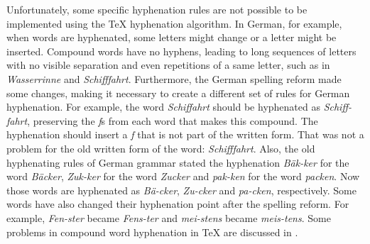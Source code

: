 \documentclass{article}
\begin{document}
Unfortunately, some specific hyphenation rules are not possible to be
implemented using the \TeX{} hyphenation algorithm. In German, for example,
when words are hyphenated, some letters might change or a letter might be
inserted.  Compound words have no hyphens, leading to long sequences of letters
with no visible separation and even repetitions of a same letter, such as in
\emph{Wasserrinne} and \emph{Schifffahrt}. Furthermore, the German spelling
reform made some changes, making it necessary to create a different set of
rules for German hyphenation.  For example, the word \emph{Schiffahrt} should
be hyphenated as \emph{Schiff-fahrt}, preserving the \emph{f}s from each word
that makes this compound. The hyphenation should insert a \emph{f} that is not
part of the written form. That was not a problem for the old written form of
the word: \emph{Schifffahrt}. Also, the old hyphenating rules of German grammar
stated the hyphenation \emph{Bäk-ker} for the word \emph{Bäcker},
\emph{Zuk-ker} for the word \emph{Zucker} and \emph{pak-ken} for the word
\emph{packen}. Now those words are hyphenated as \emph{Bä-cker}, \emph{Zu-cker}
and \emph{pa-cken}, respectively. Some words have also changed their
hyphenation point after the spelling reform. For example, \emph{Fen-ster}
became \emph{Fens-ter} and \emph{mei-stens} became \emph{meis-tens}. Some
problems in compound word hyphenation in \TeX{} are discussed in
\cite{sojka1995a}.







\end{document}
